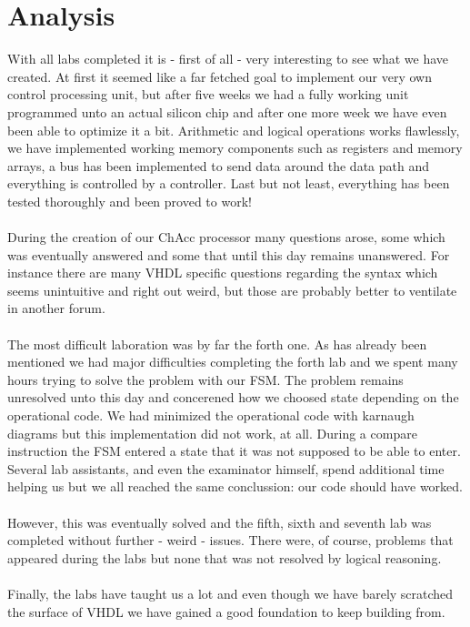 \documentclass[a4paper,11pt]{article}
\begin{document}
\section{Analysis}
With all labs completed it is - first of all - very interesting to see what 
we have created. At first it seemed like a far fetched goal to implement our 
very own control processing unit, but after five weeks we had a fully 
working unit programmed unto an actual silicon chip and after one more week 
we have even been able to optimize it a bit. Arithmetic and logical 
operations works flawlessly, we have implemented working memory components 
such as registers and memory arrays, a bus has been implemented to send data 
around the data path and everything is controlled by a controller. Last but 
not least, everything has been tested thoroughly and been proved to work!\\\\
\noindent
During the creation of our ChAcc processor many questions arose, some which 
was eventually answered and some that until this day remains unanswered. For 
instance there are many VHDL specific questions regarding the syntax which 
seems unintuitive and right out weird, but those are probably better to 
ventilate in another forum.\\\\
\noindent
The most difficult laboration was by far the forth one. As has already been 
mentioned we had major difficulties completing the forth lab and we spent 
many hours trying to solve the problem with our FSM. The problem remains 
unresolved unto this day and concerened how we choosed state depending on the 
operational code. We had minimized the operational code with karnaugh diagrams 
but this implementation did not work, at all. During a compare instruction 
the FSM entered a state that it was not supposed to be able to enter. Several 
lab assistants, and even the examinator himself, spend additional time helping 
us but we all reached the same conclussion: our code should have worked.\\\\
\noindent
However, this was eventually solved and the fifth, sixth and seventh lab 
was completed without further - weird - issues. There were, of course, problems 
that appeared during the labs but none that was not resolved by logical 
reasoning.\\\\
\noindent
Finally, the labs have taught us a lot and even though we have barely 
scratched the surface of VHDL we have gained a good foundation to keep 
building from.\\\\
\end{document}

